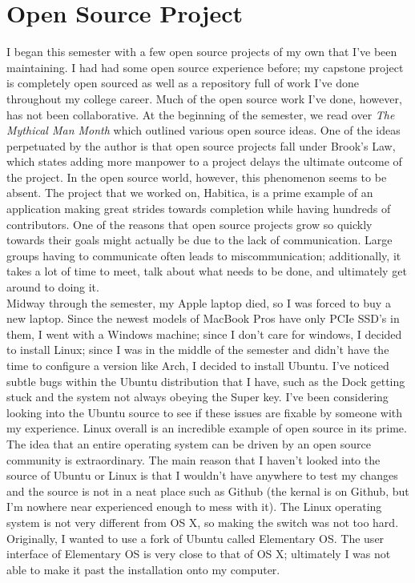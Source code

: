 \documentclass[12pt]{article}
\begin{document}
\section*{Open Source Project}

I began this semester with a few open source projects of my own that I've been maintaining. I had had some open source experience before; my capstone project is completely open sourced as well as a repository full of work I've done throughout my college career. Much of the open source work I've done, however, has not been collaborative. At the beginning of the semester, we read over \textit{The Mythical Man Month} which outlined various open source ideas. One of the ideas perpetuated by the author is that open source projects fall under Brook's Law, which states adding more manpower to a project delays the ultimate outcome of the project. In the open source world, however, this phenomenon seems to be absent. The project that we worked on, Habitica, is a prime example of an application making great strides towards completion while having hundreds of contributors. One of the reasons that open source projects grow so quickly towards their goals might actually be due to the lack of communication. Large groups having to communicate often leads to miscommunication; additionally, it takes a lot of time to meet, talk about what needs to be done, and ultimately get around to doing it.\\

Midway through the semester, my Apple laptop died, so I was forced to buy a new laptop. Since the newest models of MacBook Pros have only PCIe SSD's in them, I went with a Windows machine; since I don't care for windows, I decided to install Linux; since I was in the middle of the semester and didn't have the time to configure a version like Arch, I decided to install Ubuntu. I've noticed subtle bugs within the Ubuntu distribution that I have, such as the Dock getting stuck and the system not always obeying the Super key. I've been considering looking into the Ubuntu source to see if these issues are fixable by someone with my experience. Linux overall is an incredible example of open source in its prime. The idea that an entire operating system can be driven by an open source community is extraordinary. The main reason that I haven't looked into the source of Ubuntu or Linux is that I wouldn't have anywhere to test my changes and the source is not in a neat place such as Github (the kernal is on Github, but I'm nowhere near experienced enough to mess with it). The Linux operating system is not very different from OS X, so making the switch was not too hard. Originally, I wanted to use a fork of Ubuntu called Elementary OS. The user interface of Elementary OS is very close to that of OS X; ultimately I was not able to make it past the installation onto my computer.\\
\end{document}
